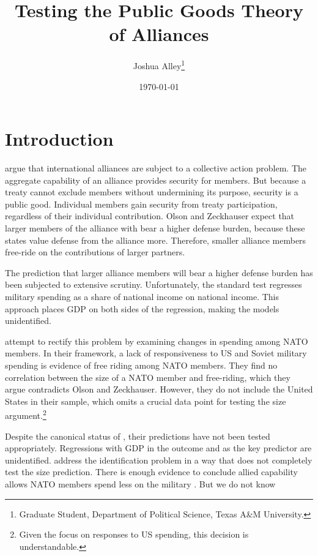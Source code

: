 \documentclass[12pt]{article}
\title{
\textbf{Testing the Public Goods Theory of Alliances}
	}
\author{Joshua Alley\footnote{Graduate Student,
Department of Political Science, Texas A\&M University.}}
\date{{\normalsize \today}}
\begin{document}
\maketitle 

\doublespace



\section{Introduction}


\citet{OlsonZeckhauser1966} argue that international alliances are subject to a collective action problem. 
The aggregate capability of an alliance provides security for members. 
But because a treaty cannot exclude members without undermining its purpose, security is a public good. 
Individual members gain security from treaty participation, regardless of their individual contribution. 
Olson and Zeckhauser expect that larger members of the alliance with bear a higher defense burden, because these states value defense from the alliance more. 
Therefore, smaller alliance members free-ride on the contributions of larger partners. 


The prediction that larger alliance members will bear a higher defense burden has been subjected to extensive scrutiny. 
Unfortunately, the standard test regresses military spending as a share of national income on national income. 
This approach places GDP on both sides of the regression, making the models unidentified. 


\citet{PluemperNeumayer2015} attempt to rectify this problem by examining changes in spending among NATO members. 
In their framework, a lack of responsiveness to US and Soviet military spending is evidence of free riding among NATO members.
They find no correlation between the size of a NATO member and free-riding, which they argue contradicts Olson and Zeckhauser. 
However, they do not include the United States in their sample, which omits a crucial data point for testing the size argument.\footnote{Given the focus on responses to US spending, this decision is understandable.}


Despite the canonical status of \citet{OlsonZeckhauser1966}, their predictions have not been tested appropriately. 
Regressions with GDP in the outcome and as the key predictor are unidentified. 
\citet{PluemperNeumayer2015} address the identification problem in a way that does not completely test the size prediction. 
There is enough evidence to conclude allied capability allows NATO members spend less on the military \citep{PluemperNeumayer2015, GeorgeSandler2017}.
But we do not know 
\end{document}
